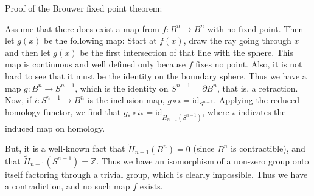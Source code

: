 \documentclass[12pt]{article}
\begin{document}
Proof of the Brouwer fixed point theorem:

Assume that there does exist a map from $f:B^n\to B^n$ with no fixed point.  Then let 
$g(x)$ be the following map:  Start at $f(x)$, draw the ray going through $x$ and then let $g(x)$ be
the first intersection of that line with the sphere.  This map is continuous and well defined only
because $f$ fixes no point. Also, it is not hard to see that it must be the identity on the boundary
sphere.  Thus we have a map $g:B^n\to S^{n-1}$, which is the identity on
$S^{n-1}=\partial B^n$, that is, a retraction. Now, if $i:S^{n-1}\to B^n$ is the inclusion
map, $g\circ i=\mathrm{id}_{S^{n-1}}$.  Applying the reduced homology functor, we find that
$g_*\circ i_*=\mathrm{id}_{\tilde{H}_{n-1}(S^{n-1})}$, where $_*$ indicates the induced map on homology.

But, it is a well-known fact that $\tilde{H}_{n-1}(B^n)=0$ (since $B^n$ is contractible), and that
$\tilde{H}_{n-1}(S^{n-1})=\mathbb{Z}$.  Thus we have an isomorphism of a non-zero group onto itself
factoring through a trivial group, which is clearly impossible.  Thus we have a contradiction,
and no such map $f$ exists.
\end{document}
